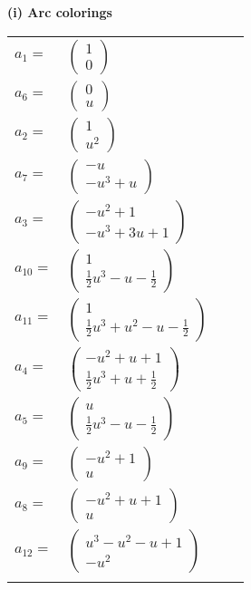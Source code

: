 \documentclass[1p]{elsarticle_modified}
\theoremstyle{definition}
\begin{document}
\flushleft \textbf{(i) Arc colorings}\\
\begin{tabular}{m{7pt} m{180pt} m{7pt} m{180pt} }
\flushright $a_{1}=$&$\begin{pmatrix}1\\0\end{pmatrix}$ \\
\flushright $a_{6}=$&$\begin{pmatrix}0\\u\end{pmatrix}$ \\
\flushright $a_{2}=$&$\begin{pmatrix}1\\u^2\end{pmatrix}$ \\
\flushright $a_{7}=$&$\begin{pmatrix}- u\\- u^3+u\end{pmatrix}$ \\
\flushright $a_{3}=$&$\begin{pmatrix}- u^2+1\\- u^3+3 u+1\end{pmatrix}$ \\
\flushright $a_{10}=$&$\begin{pmatrix}1\\\frac{1}{2} u^3- u-\frac{1}{2}\end{pmatrix}$ \\
\flushright $a_{11}=$&$\begin{pmatrix}1\\\frac{1}{2} u^3+u^2- u-\frac{1}{2}\end{pmatrix}$ \\
\flushright $a_{4}=$&$\begin{pmatrix}- u^2+u+1\\\frac{1}{2} u^3+u+\frac{1}{2}\end{pmatrix}$ \\
\flushright $a_{5}=$&$\begin{pmatrix}u\\\frac{1}{2} u^3- u-\frac{1}{2}\end{pmatrix}$ \\
\flushright $a_{9}=$&$\begin{pmatrix}- u^2+1\\u\end{pmatrix}$ \\
\flushright $a_{8}=$&$\begin{pmatrix}- u^2+u+1\\u\end{pmatrix}$ \\
\flushright $a_{12}=$&$\begin{pmatrix}u^3- u^2- u+1\\- u^2\end{pmatrix}$\\&\end{tabular}
\end{document}
